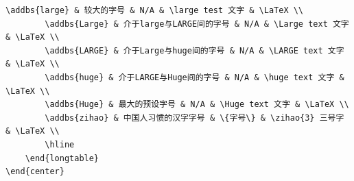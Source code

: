 \begin{lstlisting}[style = LaTeX_TeXworks]
		\addbs{large} & 较大的字号 & N/A & \large test 文字 & \LaTeX \\
		\addbs{Large} & 介于large与LARGE间的字号 & N/A & \Large text 文字 & \LaTeX \\
		\addbs{LARGE} & 介于Large与huge间的字号 & N/A & \LARGE text 文字 & \LaTeX \\
		\addbs{huge} & 介于LARGE与Huge间的字号 & N/A & \huge text 文字 & \LaTeX \\
		\addbs{Huge} & 最大的预设字号 & N/A & \Huge text 文字 & \LaTeX \\
		\addbs{zihao} & 中国人习惯的汉字字号 & \{字号\} & \zihao{3} 三号字 & \LaTeX \\
		\hline
	\end{longtable}
\end{center}
\end{lstlisting}

